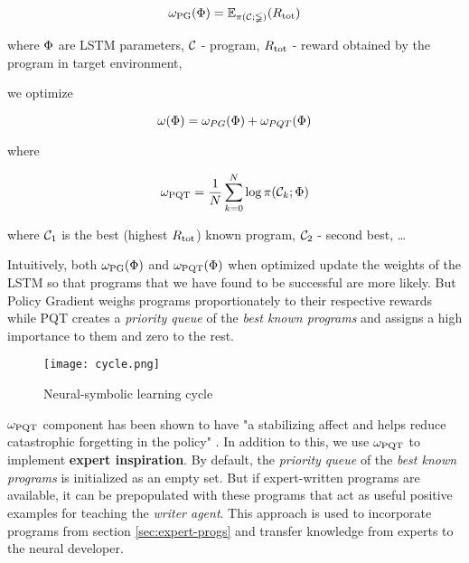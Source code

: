 \begin{equation}
    \omega_{\text{PG}}(\Phi) = \mathbb{E_{\pi(\mathcal{C}; \Phi)}}(R_\text{tot})
\end{equation}

where $\Phi$ are LSTM parameters, $\mathcal{C}$ - program, $R_\text{tot}$ - reward obtained by the program in target environment,

we optimize

\begin{equation}
    \omega(\Phi)=\omega_{PG}(\Phi)+\omega_{PQT}(\Phi)
\end{equation}

where

\begin{equation}
    \omega_{\text{PQT}} = \frac{1}{N} \sum_{k=0}^N \log \pi(\mathcal{C}_k; \Phi)
\end{equation}

where $\mathcal{C}_1$ is the best (highest $R_\text{tot}$) known program, $\mathcal{C}_2$ - second best, \dots

Intuitively, both $\omega_{\text{PG}}(\Phi)$ and $\omega_{\text{PQT}}(\Phi)$ when optimized update the weights of the LSTM so that programs that we have found to be successful are more likely.
But Policy Gradient weighs programs proportionately to their respective rewards while PQT creates a \textit{priority queue} of the \textit{best known programs} and assigns a high importance to them and zero to the rest.

\begin{figure}
    \centering
    \texttt{[image: cycle.png]}
    \caption{Neural-symbolic learning cycle \cite{cycle}}
    \label{fig:cycle}
\end{figure}

$\omega_{\text{PQT}}$ component has been shown to have "a stabilizing affect and helps reduce catastrophic forgetting in the policy" \cite{abolafiaNeuralProgramSynthesis2018}.
In addition to this, we use $\omega_{\text{PQT}}$ to implement \textbf{expert inspiration}.
By default, the \textit{priority queue} of the \textit{best known programs} is initialized as an empty set.
But if expert-written programs are available, it can be prepopulated with these programs that act as useful positive examples for teaching the \emph{writer agent}.
This approach is used to incorporate programs from section \ref{sec:expert-progs} and transfer knowledge from experts to the neural developer.

